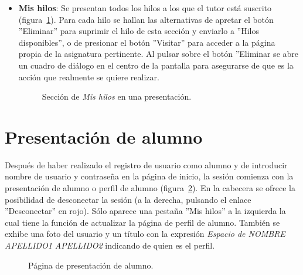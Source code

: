 \documentclass[a4paper, 12pt]{book}
\begin{document}
\begin{itemize}
  \item {\bfseries Mis hilos}: Se presentan todos los hilos a los que el tutor est\'a suscrito (figura~\ref{figura:tutor3}). Para cada hilo se hallan las 
  alternativas de apretar el bot\'on ''Eliminar'' para suprimir el hilo de esta secci\'on y enviarlo a ''Hilos disponibles'', o de presionar el bot\'on
  ''Visitar'' para acceder a la p\'agina propia de la asignatura pertinente. Al pulsar sobre el bot\'on ''Eliminar se abre un cuadro de di\'alogo en el 
  centro de la pantalla para asegurarse de que es la acci\'on que realmente se quiere realizar.
  \begin{figure}[htbp] 
    \centering
    \caption{Secci\'on de \textit{Mis hilos} en una presentaci\'on.}
    \label{figura:tutor3}
  \end{figure}
\end{itemize} 


\section{Presentaci\'on de alumno}
\label{app:presentacionalumno}
Despu\'es de haber realizado el registro de usuario como alumno y de introducir nombre de usuario y contrase\~na en la p\'agina de inicio, la sesi\'on 
comienza con la presentaci\'on de alumno o perfil de alumno (figura~\ref{figura:alumno}). En la cabecera se ofrece la posibilidad de desconectar la sesi\'on 
(a la derecha, pulsando el enlace ''Desconectar'' en rojo). S\'olo aparece una pesta\~na ''Mis hilos'' a la izquierda la cual tiene la funci\'on de 
actualizar la p\'agina de perfil de alumno. Tambi\'en se exhibe una foto del usuario y un t\'itulo con la expresi\'on 
\textit{Espacio de NOMBRE APELLIDO1 APELLIDO2} indicando de quien es el perfil.

\begin{figure}[htbp] 
  \centering
  \caption{P\'agina de presentaci\'on de alumno.}
  \label{figura:alumno}
\end{figure}
\end{document}
